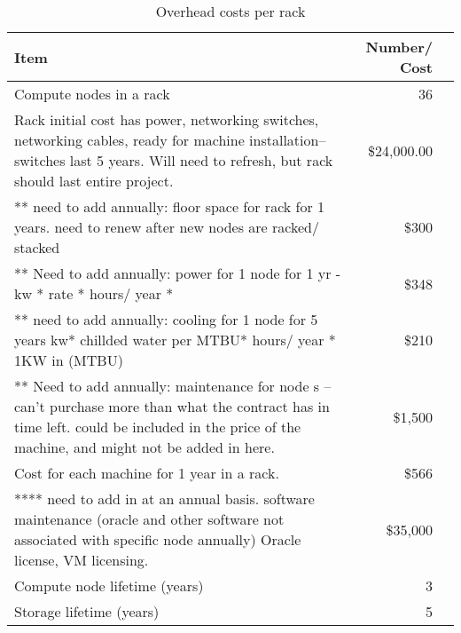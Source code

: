 \tiny \begin{longtable} { |p{}  |r  |r |} 
\caption{Overhead costs per rack \label{tab:overheads}}\\ 
\hline 
\textbf{Item}&\textbf{Number/ Cost} \\ \hline
{Compute nodes in a rack }&{36} \\ \hline
{Rack initial cost has power, networking switches, networking cables, ready for machine installation-- switches last 5 years.  Will need to refresh, but rack should last entire project.  }&{\$24,000.00} \\ \hline
{ ** need to add annually: floor space for rack for 1 years.   need to renew after new nodes are racked/ stacked }&{\$300} \\ \hline
{** Need to add annually: power for 1 node for 1 yr - kw * rate * hours/ year * }&{\$348} \\ \hline
{** need to add annually: cooling for 1 node for 5 years  kw* chillded water per MTBU* hours/ year *  1KW in (MTBU) }&{\$210} \\ \hline
{** Need to add annually: maintenance for node s -- can't purchase more than what the contract has in time left.  could be included in the price of the machine, and might not be added in here.  }&{\$1,500} \\ \hline
{Cost for each machine for 1 year in a rack.   }&{\$566} \\ \hline
{**** need to add in at an annual basis.  software maintenance (oracle and other software not associated with specific node annually)  Oracle license, VM licensing.  }&{\$35,000} \\ \hline
{Compute node lifetime (years)}&{3} \\ \hline
{Storage lifetime (years)}&{5} \\ \hline
\end{longtable} \normalsize
